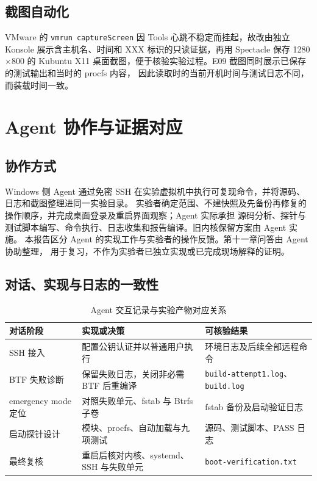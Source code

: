 \documentclass[UTF8,zihao=-4,openany,fontset=none]{ctexrep}
\begin{document}
\section{截图自动化}
VMware 的 \texttt{vmrun captureScreen} 因 Tools 心跳不稳定而挂起，故改由独立 Konsole
展示含主机名、时间和 XXX 标识的只读证据，再用 Spectacle 保存 1280\(\times\)800 的
Kubuntu X11 桌面截图，便于核验实验过程。E09 截图同时展示已保存的测试输出和当时的 procfs 内容，
因此读取时的当前开机时间与测试日志不同，而装载时间一致。

\chapter{Agent 协作与证据对应}

\section{协作方式}
Windows 侧 Agent 通过免密 SSH 在实验虚拟机中执行可复现命令，并将源码、日志和截图整理进同一实验目录。
实验者确定范围、不建快照及先备份再修复的操作顺序，并完成桌面登录及重启界面观察；Agent 实际承担
源码分析、探针与测试脚本编写、命令执行、日志收集和报告编译。旧内核保留方案由 Agent 实施。
本报告区分 Agent 的实现工作与实验者的操作反馈。第十一章问答由 Agent 协助整理，
用于复习，不作为实验者已独立实现或已完成现场解释的证明。

\section{对话、实现与日志的一致性}
\begin{table}[H]
  \centering
  \caption{Agent 交互记录与实验产物对应关系}
  \begin{tabularx}{\textwidth}{p{}p{}X}
    \toprule
    对话阶段 & 实现或决策 & 可核验结果 \\
    \midrule
    SSH 接入 & 配置公钥认证并以普通用户执行 & 环境日志及后续全部远程命令 \\
    BTF 失败诊断 & 保留失败日志，关闭非必需 BTF 后重编译 & \texttt{build-attempt1.log}、\texttt{build.log} \\
    emergency mode 定位 & 对照失败单元、fstab 与 Btrfs 子卷 & fstab 备份及启动验证日志 \\
    启动探针设计 & 模块、procfs、自动加载与九项测试 & 源码、测试脚本、PASS 日志 \\
    最终复核 & 重启后核对内核、systemd、SSH 与失败单元 & \texttt{boot-verification.txt} \\
    \bottomrule
  \end{tabularx}
\end{table}
\end{document}
